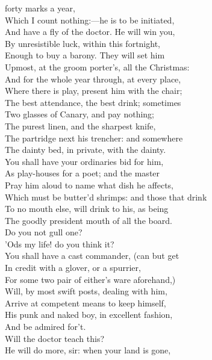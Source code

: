 \documentclass[a4paper,oneside]{memoir}
\begin{document}
\begin{drama*}
forty marks a year,\\
Which I count nothing:---he is to be initiated,\\
And have a fly of the doctor. He will win you,\\
By unresistible luck, within this fortnight,\\
Enough to buy a barony. They will set him\\
Upmost, at the groom porter's, all the Christmas:\\
And for the whole year through, at every place,\\
Where there is play, present him with the chair;\\
The best attendance, the best drink; sometimes\\
Two glasses of Canary, and pay nothing;\\
The purest linen, and the sharpest knife,\\
The partridge next his trencher: and somewhere\\
The dainty bed, in private, with the dainty.\\
You shall have your ordinaries bid for him,\\
As play-houses for a poet; and the master\\
Pray him aloud to name what dish he affects,\\
Which must be butter'd shrimps: and those that drink\\
To no mouth else, will drink to his, as being\\
The goodly president mouth of all the board.\\
\kastrilspeaks Do you not gull one?\\
\facespeaks {} 'Ods my life! do you think it?\\
You shall have a cast commander, (can but get\\
In credit with a glover, or a spurrier,\\
For some two pair of either's ware aforehand,)\\
Will, by most swift posts, dealing  with him,\\
Arrive at competent means to keep himself,\\
His punk and naked boy, in excellent fashion,\\
And be admired for't.\\
\kastrilspeaks {} Will the doctor teach this?\\
\facespeaks He will do more, sir: when your land is gone,\\

\end{drama*}
\end{document}
